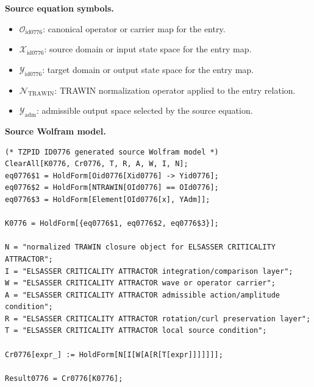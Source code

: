 \begin{minipage}[t]{0.49\linewidth}
\begingroup
\small
\raggedright
\textbf{Source equation symbols.}\par
\begin{itemize}[leftmargin=1.35em,itemsep=1pt,topsep=1pt,parsep=0pt]
    \item $\mathcal{O}_{\mathrm{id0776}}$: canonical operator or carrier map for the entry.
    \item $\mathcal{X}_{\mathrm{id0776}}$: source domain or input state space for the entry map.
    \item $\mathcal{Y}_{\mathrm{id0776}}$: target domain or output state space for the entry map.
    \item $\mathcal{N}_{\mathrm{TRAWIN}}$: TRAWIN normalization operator applied to the entry relation.
    \item $\mathcal{Y}_{\mathrm{adm}}$: admissible output space selected by the source equation.
\end{itemize}
\endgroup
\end{minipage}\hfill
\begin{minipage}[t]{0.47\linewidth}
\begingroup
\scriptsize
\raggedright
\textbf{Source Wolfram model.}\par
\begin{Verbatim}[fontsize=\tiny,breaklines=true,breakanywhere=true]
(* TZPID ID0776 generated source Wolfram model *)
ClearAll[K0776, Cr0776, T, R, A, W, I, N];
eq0776$1 = HoldForm[Oid0776[Xid0776] -> Yid0776];
eq0776$2 = HoldForm[NTRAWIN[OId0776] == OId0776];
eq0776$3 = HoldForm[Element[OId0776[x], YAdm]];

K0776 = HoldForm[{eq0776$1, eq0776$2, eq0776$3}];

N = "normalized TRAWIN closure object for ELSASSER CRITICALITY ATTRACTOR";
I = "ELSASSER CRITICALITY ATTRACTOR integration/comparison layer";
W = "ELSASSER CRITICALITY ATTRACTOR wave or operator carrier";
A = "ELSASSER CRITICALITY ATTRACTOR admissible action/amplitude condition";
R = "ELSASSER CRITICALITY ATTRACTOR rotation/curl preservation layer";
T = "ELSASSER CRITICALITY ATTRACTOR local source condition";

Cr0776[expr_] := HoldForm[N[I[W[A[R[T[expr]]]]]]];

Result0776 = Cr0776[K0776];
\end{Verbatim}
\endgroup
\end{minipage}

